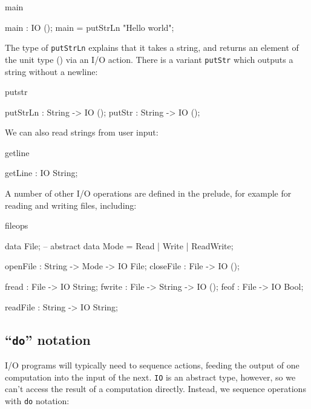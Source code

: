 \begin{SaveVerbatim}{main}

main : IO ();
main = putStrLn "Hello world";

\end{SaveVerbatim}

The type of \texttt{putStrLn} explains that it takes a string, and returns an
element of the unit type () via an I/O action. There is a variant \texttt{putStr} which
outputs a string without a newline:

\begin{SaveVerbatim}{putstr}

putStrLn : String -> IO ();
putStr   : String -> IO ();

\end{SaveVerbatim}

We can also read strings from user input:

\begin{SaveVerbatim}{getline}

getLine : IO String;

\end{SaveVerbatim}

\noindent
A number of other I/O operations are defined in the prelude, for example for reading and
writing files, including:

\begin{SaveVerbatim}{fileops}

data File; -- abstract
data Mode = Read | Write | ReadWrite;

openFile  : String -> Mode -> IO File;
closeFile : File -> IO ();

fread  : File -> IO String;
fwrite : File -> String -> IO ();
feof   : File -> IO Bool;

readFile : String -> IO String;

\end{SaveVerbatim}

\subsection{``\texttt{do}'' notation}

\label{sect:do}

I/O programs will typically need to sequence actions, feeding the output of one
computation into the input of the next. \texttt{IO} is an abstract type, however, so we
can't access the result of a computation directly. Instead, we sequence
operations with \texttt{do} notation:

